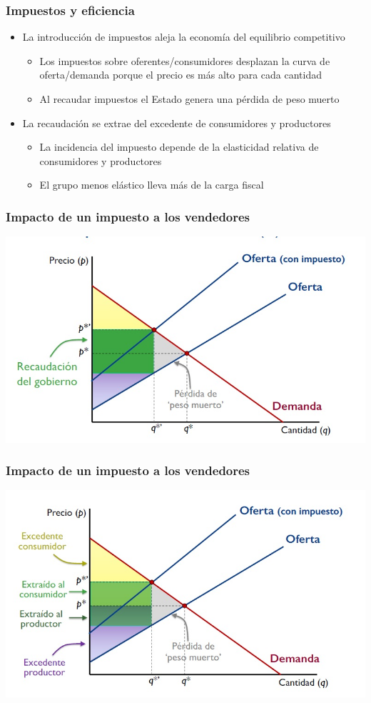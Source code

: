 \documentclass{beamer}
\begin{document}
\begin{frame}
\frametitle{Impuestos y eficiencia}
\begin{itemize}
    \item La introducción de impuestos aleja la economía del equilibrio competitivo
    \begin{itemize}
        \item Los impuestos sobre oferentes/consumidores desplazan la curva de oferta/demanda porque el precio es más alto para cada cantidad
        \item Al recaudar impuestos el Estado genera una pérdida de peso muerto
    \end{itemize}
    \item La recaudación se extrae del excedente de consumidores y productores
    \begin{itemize}
        \item La incidencia del impuesto depende de la elasticidad relativa de consumidores y productores
        \item El grupo menos elástico lleva más de la carga fiscal
    \end{itemize}
\end{itemize}
\end{frame}

\begin{frame}
\frametitle{Impacto de un impuesto a los vendedores}
\includegraphics[scale=0.6]{Slides Principios de Economia/Figures/Tema_07.29_impuesto1.jpg}
\end{frame}

\begin{frame}
\frametitle{Impacto de un impuesto a los vendedores}
\includegraphics[scale=0.6]{Slides Principios de Economia/Figures/Tema_07.30_impuesto2.jpg}
\end{frame}
\end{document}
